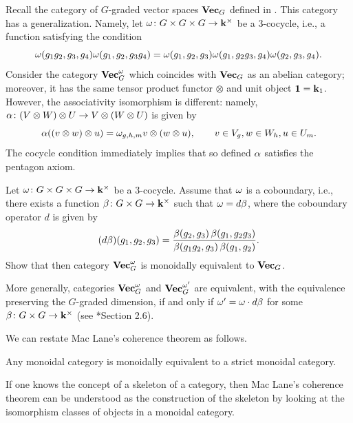 \begin{example}\label{x:vecg-twisted}
  Recall the category of $G$-graded vector spaces $\mathbf{Vec}_G$ defined in
  . This category has a generalization. Namely, let
  $\omega\colon G\times G\times G\to \mathbf{k}^\times$ be a 3-cocycle, i.e., a
  function satisfying the condition
  $$
  \omega(g_1g_2, g_3, g_4)\omega (g_1, g_2, g_3g_4) = \omega(g_1, g_2, g_3)
     \omega(g_1, g_2g_3, g_4)\omega (g_2, g_3, g_4).
  $$
  Consider the category $\mathbf{Vec}^\omega_G$ which coincides with $\mathbf{Vec}_G$ as an
  abelian category; moreover, it has the same tensor product functor $\otimes$
  and unit object $\mathbf{1}=\mathbf{k}_1$. However, the associativity isomorphism is
  different: namely, $\alpha \colon (V\otimes W)\otimes U \to V \otimes (W\otimes
  U)$ is given by
  $$
    \alpha((v \otimes w) \otimes u )= \omega_{g,h,m} v \otimes (w\otimes u),
    \qquad v\in V_g, w\in W_h, u\in U_m.
  $$
  The cocycle condition immediately implies that so defined $\alpha$ satisfies the
  pentagon axiom.
\end{example}
\begin{exercise}
  Let $\omega\colon G\times G\times G\to \mathbf{k}^\times$ be a 3-cocycle. Assume that
  $\omega$ is a coboundary, i.e., there exists a function $\beta\colon G\times
  G\to \mathbf{k}^\times$ such that $\omega=d\beta$, where the coboundary operator $d$
  is given by
  $$
    (d\beta)(g_1, g_2, g_3)=
    \frac{\beta(g_2, g_3)\,\beta(g_1, g_2g_3)}{\beta(g_1g_2, g_3)\,\beta(g_1, g_2)}.
  $$
  Show that then category $\mathbf{Vec}_G^\omega$ is monoidally equivalent to $\mathbf{Vec}_G$.

  More generally, categories $\mathbf{Vec}_G^\omega$ and $\mathbf{Vec}_G^{\omega'}$ are equivalent,
  with the equivalence preserving the $G$-graded dimension, if and only if
  $\omega'=\omega \cdot d\beta$ for some $\beta\colon G\times G\to \mathbf{k}^\times$ (see
  *{Section 2.6}).
\end{exercise}



We can restate Mac Lane's coherence theorem as follows.
\begin{theorem}\label{t:strictify}
  Any monoidal category is monoidally equivalent to a strict monoidal category.
\end{theorem}
If one knows the concept of a skeleton of a category, then Mac Lane's coherence
theorem can be understood as the construction of the skeleton by looking at the
isomorphism classes of objects in a monoidal category.






